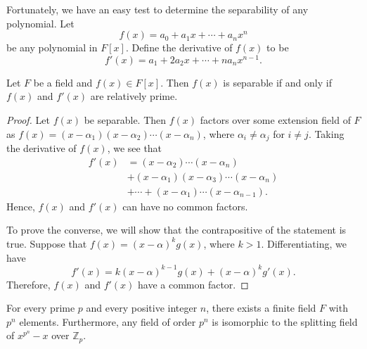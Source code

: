 Fortunately, we have an easy test to  determine the separability of any polynomial.  Let
\[
f(x) = a_0 + a_1 x + \cdots + a_n x^n
\]
be any polynomial in  $F[x]$. Define the {\bfi derivative\/} of $f(x)$ to be 
\[
f'(x) = a_1  + 2 a_2 x + \cdots + n a_n x^{n-1}.
\]

\begin{lemma}\label{finite:separable_derivative_lemma}
Let $F$ be a field and $f(x) \in F[x]$.  Then $f(x)$ is separable if and only if $f(x)$ and $f'(x)$ are relatively prime. 
\end{lemma}


\begin{proof}
Let $f(x)$ be separable.  Then $f(x)$ factors over some extension field of $F$ as $f(x) = (x - \alpha_1) (x - \alpha_2) \cdots (x - \alpha_n)$, where $\alpha_i \neq \alpha_j$ for $i \neq j$. Taking the derivative
of $f(x)$, we see that
\begin{align*}
f'(x) & =  (x - \alpha_2) \cdots (x - \alpha_n) \\
&  +  (x - \alpha_1) (x - \alpha_3) \cdots (x - \alpha_n) \\
&  + \cdots + (x - \alpha_1) \cdots (x - \alpha_{n - 1}).
\end{align*}
Hence, $f(x)$ and $f'(x)$ can have no common factors.

To prove the converse, we will show that the contrapositive of the statement is true.  Suppose that $f(x) = (x - \alpha)^k g(x)$, where $k > 1$.  Differentiating, we have
\[
f'(x) = k ( x - \alpha)^{k-1} g(x) + (x- \alpha)^k g'(x).
\]
Therefore, $f(x)$ and $f'(x)$ have a common factor.
\end{proof}


\begin{theorem}\label{finite:splitting_field_theorem}
For every  prime $p$ and every positive integer $n$, there exists a finite field $F$ with $p^n$ elements. Furthermore, any field of order $p^n$ is isomorphic to the splitting field of $x^{p^n} -x$ over ${\mathbb Z}_p$.
\end{theorem}
 

